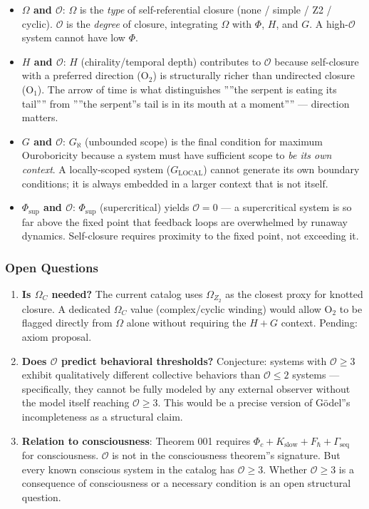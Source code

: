 \documentclass[12pt,a4paper]{article}
\begin{document}
\begin{itemize}
    \item \textbf{$\Omega$ and $\mathcal{O}$}: $\Omega$ is the \emph{type} of self-referential closure (none / simple / Z2 / cyclic). $\mathcal{O}$ is the \emph{degree} of closure, integrating $\Omega$ with $\Phi$, $H$, and $G$. A high-$\mathcal{O}$ system cannot have low $\Phi$.
    \item \textbf{$H$ and $\mathcal{O}$}: $H$ (chirality/temporal depth) contributes to $\mathcal{O}$ because self-closure with a preferred direction (O$_2$) is structurally richer than undirected closure (O$_1$). The arrow of time is what distinguishes ''''the serpent is eating its tail'''' from ''''the serpent''s tail is in its mouth at a moment'''' --- direction matters.
    \item \textbf{$G$ and $\mathcal{O}$}: $G_{\aleph}$ (unbounded scope) is the final condition for maximum Ouroboricity because a system must have sufficient scope to \emph{be its own context}. A locally-scoped system ($G_\text{LOCAL}$) cannot generate its own boundary conditions; it is always embedded in a larger context that is not itself.
    \item \textbf{$\Phi_\text{sup}$ and $\mathcal{O}$}: $\Phi_\text{sup}$ (supercritical) yields $\mathcal{O} = 0$ --- a supercritical system is so far above the fixed point that feedback loops are overwhelmed by runaway dynamics. Self-closure requires proximity to the fixed point, not exceeding it.
\end{itemize}

\subsubsection{Open Questions}

\begin{enumerate}
    \item \textbf{Is $\Omega_C$ needed?} The current catalog uses $\Omega_{Z_2}$ as the closest proxy for knotted closure. A dedicated $\Omega_C$ value (complex/cyclic winding) would allow O$_2$ to be flagged directly from $\Omega$ alone without requiring the $H + G$ context. Pending: axiom proposal.
    \item \textbf{Does $\mathcal{O}$ predict behavioral thresholds?} Conjecture: systems with $\mathcal{O} \geq 3$ exhibit qualitatively different collective behaviors than $\mathcal{O} \leq 2$ systems --- specifically, they cannot be fully modeled by any external observer without the model itself reaching $\mathcal{O} \geq 3$. This would be a precise version of Gödel''s incompleteness as a structural claim.
    \item \textbf{Relation to consciousness}: Theorem 001 requires $\Phi_c + K_\text{slow} + F_{\hbar} + \Gamma_\text{seq}$ for consciousness. $\mathcal{O}$ is not in the consciousness theorem''s signature. But every known conscious system in the catalog has $\mathcal{O} \geq 3$. Whether $\mathcal{O} \geq 3$ is a consequence of consciousness or a necessary condition is an open structural question.
\end{enumerate}
\end{document}
